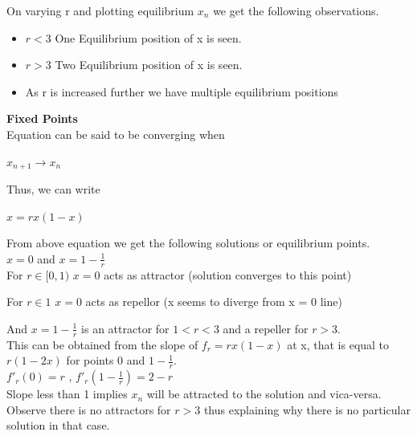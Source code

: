 \documentclass{report}
\begin{document}
On varying r and plotting equilibrium $x_{n}$ we get the following observations.

\begin{itemize}
  \item $r < 3$ One Equilibrium position of x is seen.
  \item $r > 3$ Two Equilibrium position of x is seen.
  \item As r is increased further we have multiple equilibrium positions
\end{itemize}

\textbf{Fixed Points} \\



Equation can be said to be converging when

$x_{n+1} \to x_n$

Thus, we can write

$x = rx(1-x)$

From above equation we get the following solutions or equilibrium points.\\

$x = 0$ and $x = 1 - \frac{1}{r}$\\

For $r \in [0,1)$ $x = 0$ acts as attractor (solution converges to this point)

For $r \in 1$ $x = 0$ acts as repellor (x seems to diverge from x = 0 line)

And $x = 1 - \frac{1}{r}$ is an attractor for $1 < r < 3$ and a repeller for $r > 3$.\\

This can be obtained from the slope of $f_r = rx(1-x)$ at x, that is equal to $r(1-2x)$ for points 0 and $1-\frac{1}{r}$.\\

$f'_r(0) = r$ , $f'_r(1-\frac{1}{r}) = 2-r$\\



Slope less than 1 implies $x_n$ will be attracted to the solution and vica-versa. Observe there is no attractors for $r>3$ thus explaining why there is no particular solution in that case.
\end{document}
